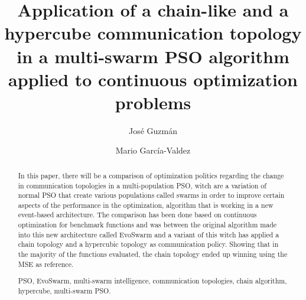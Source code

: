 \documentclass[runningheads]{llncs}
\newcommand{\keywords}[1]{\par\addvspace\baselineskip
\noindent\keywordname\enspace\ignorespaces#1}
\begin{document}
\mainmatter  %

\title{Application of a chain-like and a hypercube communication topology 
in a multi-swarm PSO algorithm applied to continuous optimization problems}


%
%
\author{José Guzmán \and Mario García-Valdez}





%
%

\toctitle{}

\maketitle


\begin{abstract}

In this paper, there will be a comparison of optimization politics regarding the
change in communication topologies in a multi-population PSO, witch are a variation of normal PSO that create various populations called swarms in order to improve certain aspects of the performance in the optimization, algorithm that is
working in a new event-based architecture. The comparison has been done
based on continuous optimization for benchmark functions and was between the
original algorithm made into this new architecture called EvoSwarm and a variant
of this witch has applied a chain topology and a hypercubic topology as communication policy. Showing that in the majority of the functions evaluated, the chain topology  ended up winning using the MSE as reference.

\keywords{PSO, EvoSwarm, multi-swarm intelligence, communication topologies,
 chain algorithm, hypercube, multi-swarm PSO.}
\end{abstract}
\end{document}

